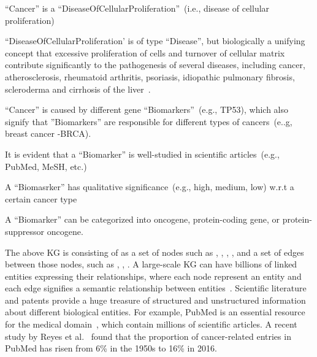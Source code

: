 \begin{itemize}[noitemsep]
\scriptsize{
    \item ``Cancer'' is a ``DiseaseOfCellularProliferation''~(i.e., disease of cellular proliferation)
    \item ``DiseaseOfCellularProliferation' is of type ``Disease'', but biologically a unifying concept that excessive proliferation of cells and turnover of cellular matrix contribute significantly to the pathogenesis of several diseases, including cancer, atherosclerosis, rheumatoid arthritis, psoriasis, idiopathic pulmonary fibrosis, scleroderma and cirrhosis of the liver~\cite{sporn1981proliferative}.
    \item ``Cancer'' is caused by different gene ``Biomarkers''~(e.g., TP53), which also signify that ''Biomarkers'' are responsible for different types of cancers~(e..g, breast cancer -BRCA). 
    \item It is evident that a ``Biomarker'' is well-studied in scientific articles~(e.g., PubMed, MeSH, etc.)
    \item A ``Biomasrker'' has qualitative significance~(e.g., high, medium, low) w.r.t a certain cancer type
    \item A ``Biomarker'' can be categorized into oncogene, protein-coding gene, or protein-suppressor oncogene. 
    }
\end{itemize}

\hspace*{3.5mm} The above KG is consisting of as a set of nodes such as , , , ,  and a set of edges between those nodes, such as , , . 
A large-scale KG can have billions of linked entities expressing their relationships, where each node represent an entity and each edge signifies a semantic relationship between entities~\cite{karim2019drug}. Scientific literature and patents provide a huge treasure of structured and unstructured information about different biological entities. For example, PubMed is an essential resource for the medical domain~\cite{xu2020building}, which contain millions of scientific articles. A recent study by Reyes et al.~\cite{reyes2017proportion} found that the proportion of cancer-related entries in PubMed has risen from 6\% in the 1950s to 16\% in 2016. 

